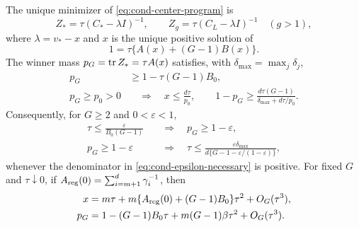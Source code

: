 \begin{proposition}
\label{prop:cond-exact-center}
The unique minimizer of \eqref{eq:cond-center-program} is
\begin{equation}
 Z_*=\tau(C_*-\lambda I)^{-1},\qquad
 Z_g=\tau(C_L-\lambda I)^{-1}\quad(g>1),
 \label{eq:cond-exact-center}
\end{equation}
where $\lambda=v_*-x$ and $x$ is the unique positive solution of
\begin{equation}
 1=\tau\{A(x)+(G-1)B(x)\}.
 \label{eq:cond-secular}
\end{equation}
The winner mass $p_G=\operatorname{tr} Z_*=\tau A(x)$ satisfies, with
$\delta_{\max}=\max_j\delta_j$,
\begin{align}
 p_G&\ge1-\tau(G-1)B_0,                                  \label{eq:cond-finite-lower}\\
 p_G\ge p_0>0&\quad\Longrightarrow\quad
 x\le\frac{d\tau}{p_0},\qquad
 1-p_G\ge\frac{d\tau(G-1)}{\delta_{\max}+d\tau/p_0}.
                                                               \label{eq:cond-finite-converse}
\end{align}
Consequently, for $G\ge2$ and $0<\varepsilon<1$,
\begin{align}
 \tau\le\frac{\varepsilon}{B_0(G-1)}
 &\quad\Longrightarrow\quad p_G\ge1-\varepsilon,          \label{eq:cond-epsilon-sufficient}\\
 p_G\ge1-\varepsilon
 &\quad\Longrightarrow\quad
 \tau\le\frac{\varepsilon\delta_{\max}}
 {d\{G-1-\varepsilon/(1-\varepsilon)\}},                  \label{eq:cond-epsilon-necessary}
\end{align}
whenever the denominator in \eqref{eq:cond-epsilon-necessary} is positive.
For fixed $G$ and $\tau\downarrow0$, if
$A_{\rm reg}(0)=\sum_{i=m+1}^d\gamma_i^{-1}$, then
\begin{align}
 x&=m\tau+m\{A_{\rm reg}(0)+(G-1)B_0\}\tau^2+O_G(\tau^3),
                                                               \label{eq:cond-small-tau-x}\\
 p_G&=1-(G-1)B_0\tau+m(G-1)\beta\tau^2+O_G(\tau^3).
                                                               \label{eq:cond-small-tau-p}
\end{align}
\end{proposition}

